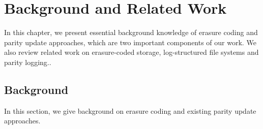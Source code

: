 \chapter{Background and Related Work}
\label{chap:background}

In this chapter, we present essential background knowledge of erasure coding and
parity update approaches, which are two important components of our work.
We also review related work on erasure-coded storage, log-structured file
systems and parity logging..

\section{Background}

In this section, we give background on erasure coding and existing parity
update approaches.


%



